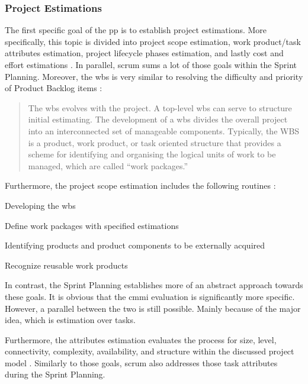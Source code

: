 \subsubsection{Project Estimations}

The first specific goal of the \ac{pp} is to establish project estimations. More specifically, this topic is divided into project scope estimation, work product/task attributes estimation, project lifecycle phases estimation, and lastly cost and effort estimations \citep[page 283]{team2010cmmi}. In parallel, \ac{scrum} sums a lot of those goals within the Sprint Planning. Moreover, the \acrfull{wbs} is very similar to resolving the difficulty and priority of Product Backlog items \citep[page 283]{team2010cmmi}:

\begin{quote}
The \ac{wbs} evolves with the project. A top-level \ac{wbs} can serve to structure initial estimating. The development of a \ac{wbs} divides the overall project into an interconnected set of manageable components.
Typically, the WBS is a product, work product, or task oriented structure that provides a scheme for identifying and organising the logical units of work to be managed, which are called “work packages.” 
\end{quote}

Furthermore, the project scope estimation includes the following routines \citep[page 284]{team2010cmmi}:

\begin{compactitem}
    \item Developing the \ac{wbs}
    \item Define work packages with specified estimations
    \item Identifying products and product components to be externally acquired
    \item Recognize reusable work products
\end{compactitem}

In contrast, the Sprint Planning establishes more of an abstract approach towards these goals. It is obvious that the \ac{cmmi} evaluation is significantly more specific. However, a parallel between the two is still possible. Mainly because of the major idea, which is estimation over tasks. 

Furthermore, the attributes estimation evaluates the process for size, level, connectivity, complexity, availability, and structure within the discussed project model \citep[page 284]{team2010cmmi}. Similarly to those goals, \ac{scrum} also addresses those task attributes during the Sprint Planning. 

